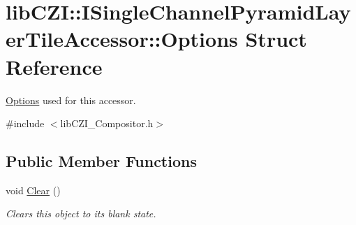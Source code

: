 \hypertarget{structlib_c_z_i_1_1_i_single_channel_pyramid_layer_tile_accessor_1_1_options}{}\section{lib\+C\+ZI\+:\+:I\+Single\+Channel\+Pyramid\+Layer\+Tile\+Accessor\+:\+:Options Struct Reference}
\label{structlib_c_z_i_1_1_i_single_channel_pyramid_layer_tile_accessor_1_1_options}


\hyperlink{structlib_c_z_i_1_1_i_single_channel_pyramid_layer_tile_accessor_1_1_options}{Options} used for this accessor.  




{\ttfamily \#include $<$lib\+C\+Z\+I\+\_\+\+Compositor.\+h$>$}

\subsection*{Public Member Functions}
\begin{DoxyCompactItemize}
\item 
\mbox{\label{structlib_c_z_i_1_1_i_single_channel_pyramid_layer_tile_accessor_1_1_options_acfdba60d24c4f9a8ae27767a91c817df}} 
void \hyperlink{structlib_c_z_i_1_1_i_single_channel_pyramid_layer_tile_accessor_1_1_options_acfdba60d24c4f9a8ae27767a91c817df}{Clear} ()
\begin{DoxyCompactList}\small\item\em Clears this object to its blank state. \end{DoxyCompactList}\end{DoxyCompactItemize}
